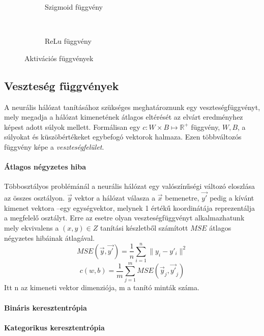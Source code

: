 \begin{figure}[h]
	\centering
	\begin{subfigure}[b]{0.3\textwidth}
		\def\svgwidth{0.5\columnwidth}
		
		\caption{Szigmoid függvény}
		\label{fig:sigmoid}
	\end{subfigure}
	~
	\begin{subfigure}[b]{0.3\textwidth}
		\def\svgwidth{0.5\columnwidth}
		
		\caption{ReLu függvény}
	\end{subfigure}
	\caption{Aktivációs függvények }
\end{figure}

\subsection{Veszteség függvények}
A neurális hálózat tanításához szükséges meghatároznunk egy veszteségfüggvényt, mely megadja a hálózat kimenetének átlagos eltérését az elvárt eredményhez képest adott súlyok mellett. Formálisan egy $c:W\times B \mapsto \mathbb{R}^+$ függvény, $W,B$, a súlyokat és küszöbértékeket egybefogó vektorok halmaza. Ezen többváltozós függvény képe a \emph{veszteségfelület}. 
\paragraph[MSE]{Átlagos négyzetes hiba}
Többosztályos problémánál a neurális hálózat egy valószínűségi változó eloszlása az összes osztályon. $\vec{y}$ vektor a hálózat válasza a $\vec{x}$ bemenetre, $\vec{y'}$ pedig a kívánt kimenet vektora --egy egységvektor, melynek 1 értékű koordinátája reprezentálja a megfelelő osztályt. Erre az esetre olyan veszteségfüggvényt alkalmazhatunk mely ekvivalens a $(x,y)\in Z$ tanítási készletből számított $MSE$ átlagos négyzetes hibáinak átlagával.
$$ MSE(\vec{y},\vec{y'}) = \frac{1}{n}\sum_{i=1}^{n} \|y_i - y'_i\|^2 $$
$$ c(w,b) = \frac{1}{m}\sum_{j=1}^{m} MSE(\vec{y}_j,\vec{y'}_j) $$
Itt n az kimeneti vektor dimenziója, m a tanító minták száma.

\paragraph{Bináris keresztentrópia}

\paragraph{Kategorikus keresztentrópia}

